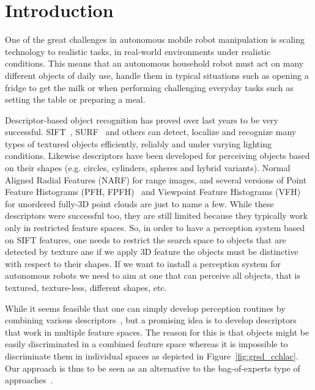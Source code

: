 \documentclass[conference]{sty/IEEEtran}
\begin{document}
\IEEEpeerreviewmaketitle

\section{Introduction}
One of the great challenges in autonomous mobile robot manipulation is scaling
technology to realistic tasks, in real-world environments under realistic
conditions. This means that an autonomous household robot must act on many
different objects of daily use, handle them in typical situations such as
opening a fridge to get the milk or when performing challenging everyday tasks
such as setting the table or preparing a meal.

Descriptor-based object recognition has proved over last years to be very successful.
SIFT~\cite{lowe04distinctive}, SURF~\cite{surf} and others can
detect, localize and recognize many types of textured objects efficiently, reliably
and under varying lighting conditions. Likewise descriptors have been developed 
for perceiving objects based on their shapes (e.g. circles, cylinders, spheres and hybrid variants).
Normal Aligned Radial Features (NARF)\cite{steder10irosws} for range images, 
and several versions of Point Feature  Histograms (PFH, FPFH)~\cite{Rusu09ICRA} and 
Viewpoint Feature Histograms (VFH)~\cite{vfh} for unordered fully-3D point clouds are just 
to name a few. While these descriptors were successful too, they are still limited because they
typically work only in restricted feature spaces. So, in order to have a perception system
based on SIFT features, one needs to restrict the search space to objects that are detected by
texture ane if we apply 3D feature the objects must be distinctive with respect to their shapes. 
If we want to install a perception system for autonomous robots we need to aim 
at one that can perceive all objects, that is textured, texture-less, different shapes, etc.

While it seems feasible that one can simply develop perception routines by combining
various descriptors~\cite{stueckler10combining, GRSD10Humanoids}, but a promising idea 
is to develop descriptors that work in multiple feature spaces. The reason for this is 
that objects might be easily discriminated in a combined feature space whereas it is impossible 
to discriminate them in individual spaces as depicted in Figure~\ref{fig:grsd_cchlac}.
Our approach is thus to be seen as an alternative to the bag-of-experts type
of approaches~\cite{Varma07learningthe}.
\end{document}
